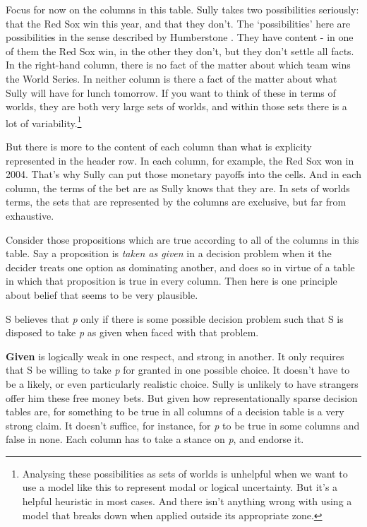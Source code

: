 \documentclass[
  11pt,
]{book}
\providecommand{\tightlist}{%
  \setlength{\itemsep}{0pt}\setlength{\parskip}{0pt}}
\begin{document}
Focus for now on the columns in this table. Sully takes two possibilities seriously: that the Red Sox win this year, and that they don't. The `possibilities' here are possibilities in the sense described by Humberstone \citeyearpar{Humberstone1981}. They have content - in one of them the Red Sox win, in the other they don't, but they don't settle all facts. In the right-hand column, there is no fact of the matter about which team wins the World Series. In neither column is there a fact of the matter about what Sully will have for lunch tomorrow. If you want to think of these in terms of worlds, they are both very large sets of worlds, and within those sets there is a lot of variability.\footnote{Analysing these possibilities as sets of worlds is unhelpful when we want to use a model like this to represent modal or logical uncertainty. But it's a helpful heuristic in most cases. And there isn't anything wrong with using a model that breaks down when applied outside its appropriate zone.}

But there is more to the content of each column than what is explicity represented in the header row. In each column, for example, the Red Sox won in 2004. That's why Sully can put those monetary payoffs into the cells. And in each column, the terms of the bet are as Sully knows that they are. In sets of worlds terms, the sets that are represented by the columns are exclusive, but far from exhaustive.

Consider those propositions which are true according to all of the columns in this table. Say a proposition is \emph{taken as given} in a decision problem when it the decider treats one option as dominating another, and does so in virtue of a table in which that proposition is true in every column. Then here is one principle about belief that seems to be very plausible.

\begin{description}
\tightlist
\item[Given]
S believes that \emph{p} only if there is some possible decision problem such that S is disposed to take \emph{p} as given when faced with that problem.
\end{description}

\textbf{Given} is logically weak in one respect, and strong in another. It only requires that S be willing to take \emph{p} for granted in one possible choice. It doesn't have to be a likely, or even particularly realistic choice. Sully is unlikely to have strangers offer him these free money bets. But given how representationally sparse decision tables are, for something to be true in all columns of a decision table is a very strong claim. It doesn't suffice, for instance, for \emph{p} to be true in some columns and false in none. Each column has to take a stance on \emph{p}, and endorse it.
\end{document}
